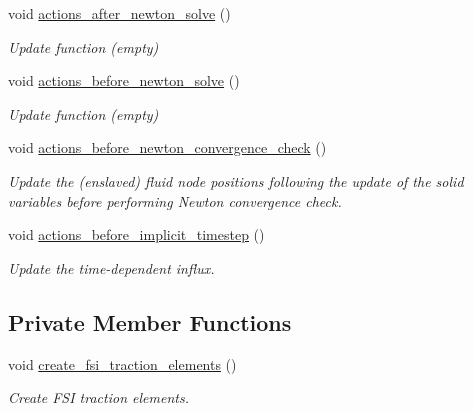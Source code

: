 \begin{DoxyCompactItemize}
void \hyperlink{classTurekProblem_ae97d3bad44e12274168e883c966b3983}{actions\+\_\+after\+\_\+newton\+\_\+solve} ()
\begin{DoxyCompactList}\small\item\em Update function (empty) \end{DoxyCompactList}\item 
void \hyperlink{classTurekProblem_a889518fdaf0c4215e21981afbfc669bd}{actions\+\_\+before\+\_\+newton\+\_\+solve} ()
\begin{DoxyCompactList}\small\item\em Update function (empty) \end{DoxyCompactList}\item 
void \hyperlink{classTurekProblem_aa896171b1a817ca35cba9b723bb15ed2}{actions\+\_\+before\+\_\+newton\+\_\+convergence\+\_\+check} ()
\begin{DoxyCompactList}\small\item\em Update the (enslaved) fluid node positions following the update of the solid variables before performing Newton convergence check. \end{DoxyCompactList}\item 
void \hyperlink{classTurekProblem_a4ad226ceec27cb3c3ea4d1ecfd4e573f}{actions\+\_\+before\+\_\+implicit\+\_\+timestep} ()
\begin{DoxyCompactList}\small\item\em Update the time-\/dependent influx. \end{DoxyCompactList}\end{DoxyCompactItemize}
\subsection*{Private Member Functions}
\begin{DoxyCompactItemize}
\item 
void \hyperlink{classTurekProblem_ad460a2e860c9425297cf70ee125de10b}{create\+\_\+fsi\+\_\+traction\+\_\+elements} ()
\begin{DoxyCompactList}\small\item\em Create F\+SI traction elements. \end{DoxyCompactList}\end{DoxyCompactItemize}
